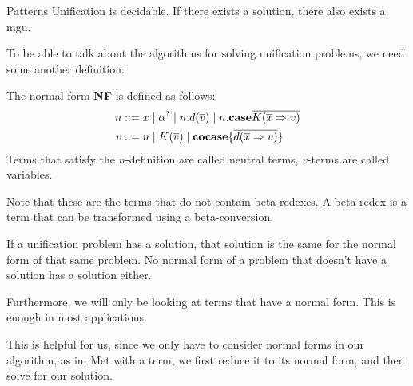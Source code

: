 \documentclass[twoside,12pt,a4paper]{article}
\begin{document}
\begin{theorem}
    Patterns Unification is decidable. If there exists a solution, there also exists a mgu.
\end{theorem}


To be able to talk about the algorithms for solving unification problems, we need some another definition: %
\begin{definition}
    The normal form \textbf{NF} is defined as follows:
    \begin{align*}
        n &::= x \;|\; \alpha^? \;|\; n.d(\overline{v})\;|\; n.\textbf{case}{\overline{K(\overline{x}\Rightarrow v)}}\\
        v &::= n \;|\; K(\overline{v}) \;|\; \textbf{cocase}\{\overline{d(\overline{x}\Rightarrow v)}\}
    \end{align*}
    Terms that satisfy the $n$-definition are called neutral terms, $v$-terms are called variables.
\end{definition}
Note that these are the terms that do not contain beta-redexes. 
A beta-redex is a term that can be transformed using a beta-conversion. 

\begin{theorem}
    If a unification problem has a solution, that solution is the same for the normal form of that same problem. 
    No normal form of a problem that doesn't have a solution has a solution either.
\end{theorem}

Furthermore, we will only be looking at terms that have a normal form. This is enough in most applications. %

This is helpful for us, since we only have to consider normal forms in our algorithm, as in: 
Met with a term, we first reduce it to its normal form, and then solve for our solution.








\end{document}
